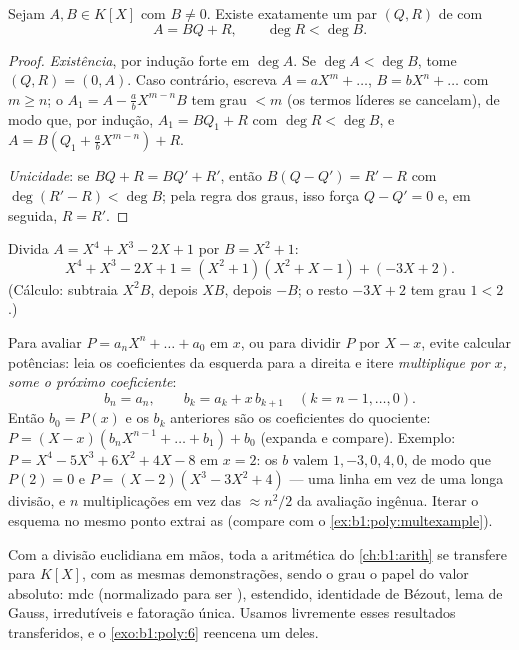 \begin{theorem}\label{thm:b1:poly:division}
Sejam $A, B \in K[X]$ com $B \neq 0$. Existe exatamente um par $(Q,
R)$ de  com
\[
A = BQ + R, \qquad \deg R < \deg B .
\]
\end{theorem}

\begin{proof}
\emph{Existência}, por indução forte em $\deg A$. Se $\deg A < \deg
B$, tome $(Q, R) = (0, A)$. Caso contrário, escreva $A = a X^m + \dots$, $B =
b X^n + \dots$ com $m \geq n$; o  $A_1 = A - \frac ab
X^{m-n} B$ tem grau $< m$ (os termos líderes se cancelam), de modo que, por
indução, $A_1 = BQ_1 + R$ com $\deg R < \deg B$, e $A = B(Q_1 +
\frac ab X^{m-n}) + R$.

\emph{Unicidade}: se $BQ + R = BQ' + R'$, então $B(Q - Q') = R' - R$
com $\deg(R' - R) < \deg B$; pela regra dos graus, isso força $Q - Q'
= 0$ e, em seguida, $R = R'$.
\end{proof}

\begin{example}\label{ex:b1:poly:division}
Divida $A = X^4 + X^3 - 2X + 1$ por $B = X^2 + 1$:
\[
X^4 + X^3 - 2X + 1 = (X^2 + 1)(X^2 + X - 1) + (-3X + 2).
\]
(Cálculo: subtraia $X^2 B$, depois $X B$, depois $-B$; o resto
$-3X + 2$ tem grau $1 < 2$.)
\end{example}

\begin{method}\label{met:b1:poly:horner}
Para avaliar $P = a_nX^n + \dots + a_0$ em $x$, ou para dividir $P$ por
$X - x$, evite calcular potências: leia os coeficientes da esquerda para
a direita e itere \emph{multiplique por $x$, some o próximo
coeficiente}:
\[
b_n = a_n, \qquad b_{k} = a_{k} + x\,b_{k+1}
\quad (k = n-1, \dots, 0) .
\]
Então $b_0 = P(x)$ e os $b_k$ anteriores são os coeficientes do
quociente: $P = (X - x)(b_nX^{n-1} + \dots + b_1) + b_0$
(expanda e compare). Exemplo: $P = X^4 - 5X^3 + 6X^2 + 4X - 8$
em $x = 2$: os $b$ valem $1, -3, 0, 4, 0$, de modo que $P(2) = 0$ e $P
= (X-2)(X^3 - 3X^2 + 4)$ --- uma linha em vez de uma longa
divisão, e $n$ multiplicações em vez das $\approx n^2/2$
da avaliação ingênua. Iterar o esquema no mesmo ponto
extrai as  (compare com o
\cref{ex:b1:poly:multexample}).
\end{method}

\begin{remark}[{A aritmética de $K[X]$}]
Com a divisão euclidiana em mãos, toda a aritmética do
\cref{ch:b1:arith} se transfere para $K[X]$, com as mesmas demonstrações,
sendo o grau o papel do valor absoluto: mdc (normalizado para ser
),  estendido, identidade de Bézout, lema de
Gauss,  irredutíveis e fatoração única. Usamos livremente esses
resultados transferidos, e o \cref{exo:b1:poly:6} reencena um deles.
\end{remark}

